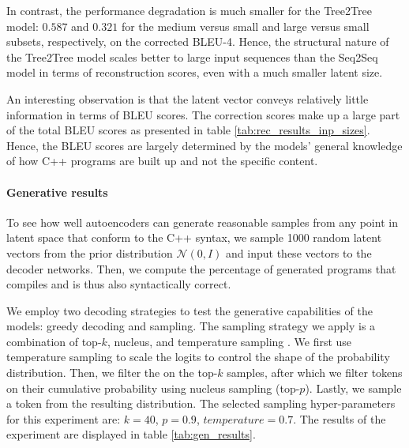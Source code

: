 In contrast, the performance degradation is much smaller for the Tree2Tree model:  $0.587$ and $0.321$ for the medium versus small and large versus small subsets, respectively, on the corrected BLEU-4. Hence, the structural nature of the Tree2Tree model scales better to large input sequences than the Seq2Seq model in terms of reconstruction scores, even with a much smaller latent size. 



An interesting observation is that the latent vector conveys relatively little information in terms of BLEU scores. The correction scores make up a large part of the total BLEU scores as presented in table \ref{tab:rec_results_inp_sizes}. Hence, the BLEU scores are largely determined by the models' general knowledge of how C++ programs are built up and not the specific content.

\paragraph{Generative results}
\label{results:gen}
To see how well autoencoders can generate reasonable samples from any point in latent space that conform to the C++ syntax, we sample 1000 random latent vectors from the prior distribution $\mathcal{N}(0, I)$ and input these vectors to the decoder networks. Then, we compute the percentage of generated programs that compiles and is thus also syntactically correct.



We employ two decoding strategies to test the generative capabilities of the models: greedy decoding and sampling. The sampling strategy we apply is a combination of top-$k$, nucleus, and temperature sampling \cite{holtzman2019curious}. We first use temperature sampling to scale the logits to control the shape of the probability distribution. Then, we filter the on the top-$k$ samples, after which we filter tokens on their cumulative probability using nucleus sampling (top-$p$). Lastly, we sample a token from the resulting distribution. The selected sampling hyper-parameters for this experiment are: $k=40$, $p=0.9$, $temperature=0.7$. The results of the experiment are displayed in table \ref{tab:gen_results}.

